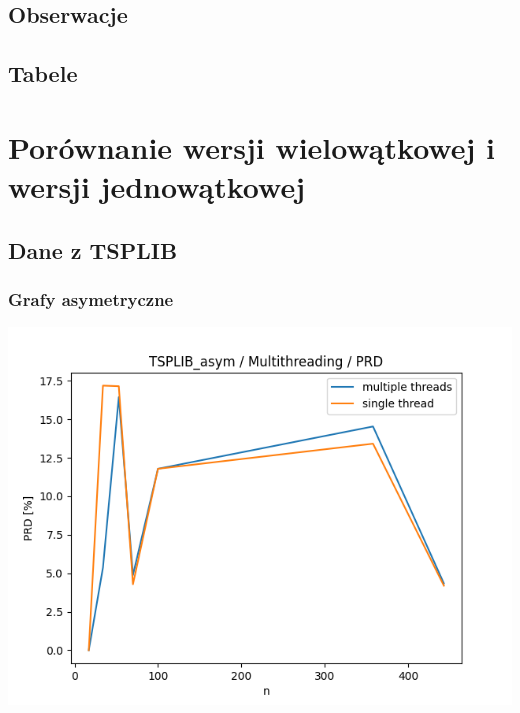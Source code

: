 \documentclass{article}
\begin{document}
\subsection{Obserwacje}

\subsection{Tabele}



\section{Porównanie wersji wielowątkowej i wersji jednowątkowej}

\subsection{Dane z TSPLIB}

\subsubsection{Grafy asymetryczne}

\begin{center}
\includegraphics[width=\textwidth, 
                   height = 0.4\textheight, 
                   keepaspectratio]
                  {plots/multithreading_tsplib_asym_prd} 
\end{center}
\end{document}
